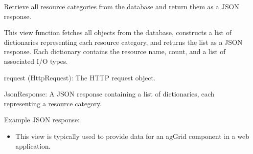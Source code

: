 \documentclass[letterpaper,10pt,english]{sphinxmanual}
\begin{document}

\begin{fulllineitems}
\label{\detokenize{app:app.views.get_resources}}
\pysigstartsignatures
{}
\pysigstopsignatures
\sphinxAtStartPar
Retrieve all resource categories from the database and return them as a JSON response.

\sphinxAtStartPar
This view function fetches all  objects from the database, 
constructs a list of dictionaries representing each resource category, and returns 
the list as a JSON response. Each dictionary contains the resource name, count, and 
a list of associated I/O types.
\begin{description}
\sphinxAtStartPar
request (HttpRequest): The HTTP request object.

\sphinxAtStartPar
JsonResponse: A JSON response containing a list of dictionaries, each representing a resource category.

\sphinxAtStartPar
Example JSON response:

\begin{sphinxVerbatim}[commandchars=\\\{\}]
\PYG{p}{[}
\PYG{p}{[}\PYG{p}{]}
\PYG{p}{[}\PYG{p}{]}
\PYG{p}{]}
\end{sphinxVerbatim}

\begin{itemize}
\item {} 
\sphinxAtStartPar
This view is typically used to provide data for an ag\sphinxhyphen{}Grid component in a web application.


\end{itemize}
\end{description}
\end{fulllineitems}
\end{document}
